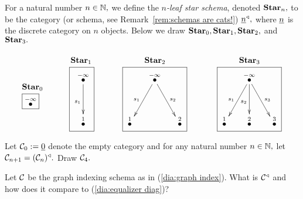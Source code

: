 \documentclass[../main/CT4S-EN-RU]{subfiles}
\begin{document}
\begin{exampleENG}\label{ex:stars}
For a natural number $n\in{\mathbb N},$ we define the {\em $n$-leaf star schema}, denoted ${\mathbf{Star}}_n,$ to be the category (or schema, see Remark~\ref{rem:schemas are cats!}) $\underline{n}^\triangleleft,$ where $\underline{n}$ is the discrete category on $n$ objects. Below we draw ${\mathbf{Star}}_0, {\mathbf{Star}}_1, {\mathbf{Star}}_2,$ and ${\mathbf{Star}}_3.$
$$
\parbox{.3in}{\boxtitle{$\Star_0$}\fbox{$\LMO{-\infty}$}}
\hspace{.5in}
\parbox{.4in}{\boxtitle{$\Star_1$}\fbox{\xymatrix@=15pt{\LMO{-\infty}\ar[dd]_{s_1}\\\\\LMO{1}}}}
\hspace{.5in}
\parbox{1.1in}{\boxtitle{$\Star_2$}\fbox{\xymatrix@=15pt{&\LMO{-\infty}\ar[ddl]_{s_1}\ar[ddr]^{s_2}\\\\\LMO{1}&&\LMO{2}}}}
\hspace{.5in}
\parbox{1.1in}{\boxtitle{$\Star_3$}\fbox{\xymatrix@=15pt{&\LMO{-\infty}\ar[ddl]_{s_1}\ar[dd]_{s_2}\ar[ddr]^{s_3}\\\\\LMO{1}&\LMO{2}&\LMO{3}}}}
$$
\end{exampleENG}

\begin{exampleRUS}\label{ex:stars}
\end{exampleRUS}

\begin{exerciseENG}
Let $\mathcal{C}_0:=\underline{0}$ denote the empty category and for any natural number $n\in{\mathbb N},$ let $\mathcal{C}_{n+1}=(\mathcal{C}_n)^\triangleleft.$ Draw $\mathcal{C}_4.$  
\end{exerciseENG}

\begin{exerciseRUS}
\end{exerciseRUS}

\begin{exerciseENG}
Let $\mathcal{C}$ be the graph indexing schema as in (\ref{dia:graph index}). What is $\mathcal{C}^\triangleleft$ and how does it compare to (\ref{dia:equalizer diag})? 
\end{exerciseENG}

\begin{exerciseRUS}
\end{exerciseRUS}
\end{document}
